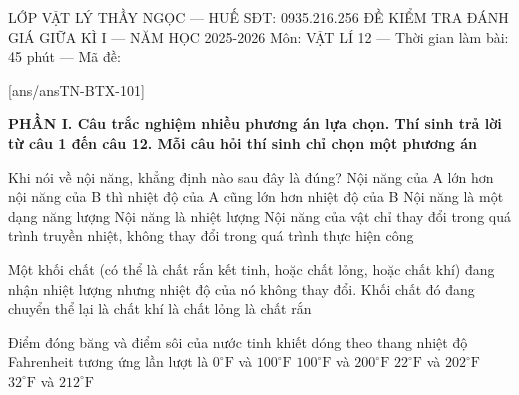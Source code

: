 

\def\toanlop{12}
\def\thoigian{45}
\def\namhoc{2025 - 2026}
\begin{dethi}
	{LỚP VẬT LÝ THẦY NGỌC --- HUẾ}
	{SĐT: 0935.216.256}
	{ĐỀ KIỂM TRA ĐÁNH GIÁ GIỮA KÌ I --- NĂM HỌC 2025-2026}
	{Môn: VẬT LÍ 12 --- Thời gian làm bài: 45 phút --- Mã đề: \thedeso}
\end{dethi}

[ans/ansTN-BTX-101]

\noindent \textbf{PHẦN I. Câu trắc nghiệm nhiều phương án lựa chọn. Thí sinh trả lời từ câu 1 đến câu 12. Mỗi câu hỏi thí sinh chỉ chọn một phương án}
\vspace{0.2cm}

\begin{ex}%
	Khi nói về nội năng, khẳng định nào sau đây là đúng?
	\choice
	{Nội năng của A lớn hơn nội năng của B thì nhiệt độ của A cũng lớn hơn nhiệt độ của B}
	{\True Nội năng là một dạng năng lượng}
	{Nội năng là nhiệt lượng}
	{Nội năng của vật chỉ thay đổi trong quá trình truyền nhiệt, không thay đổi trong quá trình thực hiện công}
\end{ex}

\begin{ex}%
	Một khối chất (có thể là chất rắn kết tinh, hoặc chất lỏng, hoặc chất khí) đang nhận nhiệt lượng nhưng nhiệt độ của nó không thay đổi. Khối chất đó
	\choice
	{\True đang chuyển thể}
	{lại là chất khí}
	{là chất lỏng}
	{là chất rắn}
\end{ex}

\begin{ex}%
	Điểm đóng băng và điểm sôi của nước tinh khiết dóng theo thang nhiệt độ Fahrenheit tương ứng lần lượt là
	\choice
	{$0^\circ\text{F}$ và $100^\circ\text{F}$}
	{$100^\circ\text{F}$ và $200^\circ\text{F}$}
	{$22^\circ\text{F}$ và $202^\circ\text{F}$}
	{\True $32^\circ\text{F}$ và $212^\circ\text{F}$}
\end{ex}

